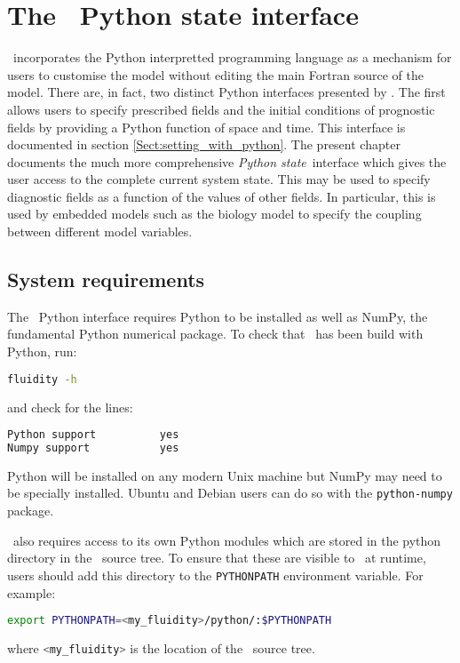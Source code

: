 \chapter{The \fluidity\ Python state interface}\label{chap:python}

\fluidity\ incorporates the Python interpretted programming language as a
mechanism for users to customise the model without editing the main Fortran
source of the model. There are, in fact, two distinct Python interfaces
presented by \fluidity. The first allows users to specify prescribed fields
and the initial conditions of prognostic fields by providing a Python
function of space and time. This interface is documented in section
\ref{Sect:setting_with_python}. The present chapter documents the much more
comprehensive \emph{Python state}\ interface which gives the user access to
the complete current system state. This may be used to specify diagnostic
fields as a function of the values of other fields. In particular, this is
used by embedded models such as the biology model to specify the coupling
between different model variables.

\section{System requirements}

The \fluidity\ Python interface requires Python to be installed as well as
NumPy, the fundamental Python numerical package. To check that \fluidity\
has been build with Python, run:
\begin{lstlisting}[language=Bash]
  fluidity -h
\end{lstlisting}
and check for the lines:
\begin{lstlisting}[language=Bash]
Python support			yes
Numpy support			yes
\end{lstlisting}
Python will be installed on any modern Unix machine but NumPy may need to be
specially installed. Ubuntu and Debian users can do so with the
\lstinline[language=Bash]+python-numpy+ package.

\fluidity\ also requires access to its own Python modules which are stored in
the python directory in the \fluidity\ source tree. To ensure that these are
visible to \fluidity\ at runtime, users should add this directory to the
\lstinline[language=Bash]+PYTHONPATH+ environment variable. For example:\
\begin{lstlisting}[language=Bash]
export PYTHONPATH=<my_fluidity>/python/:$PYTHONPATH
\end{lstlisting}%
where \lstinline[language=Bash]+<my_fluidity>+ is the location of the
\fluidity\ source tree.

